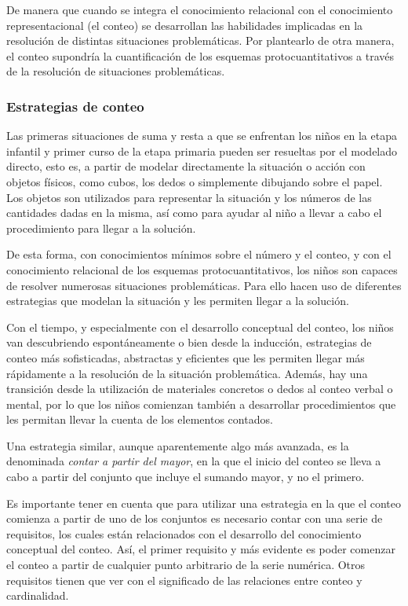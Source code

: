 \documentclass{article}
\begin{document}
De manera que cuando se integra el conocimiento relacional con el conocimiento representacional (el conteo) se desarrollan las habilidades implicadas en la resolución de distintas situaciones problemáticas. Por plantearlo de otra manera, el conteo supondría la cuantificación de los esquemas protocuantitativos a través de la resolución de situaciones problemáticas. 

\subsubsection{Estrategias de conteo}
Las primeras situaciones de suma y resta a que se enfrentan los niños en la etapa infantil y primer curso de la etapa primaria pueden ser resueltas por el modelado directo, esto es, a partir de modelar directamente la situación o acción con objetos físicos, como cubos, los dedos o simplemente dibujando sobre el papel. Los objetos son utilizados para representar la situación y los números de las cantidades dadas en la misma, así como para ayudar al niño a llevar a cabo el procedimiento para llegar a la solución.

De esta forma, con conocimientos mínimos sobre el número y el conteo, y con el conocimiento relacional de los esquemas protocuantitativos, los niños son capaces de resolver numerosas situaciones problemáticas. Para ello hacen uso de diferentes estrategias que modelan la situación y les permiten llegar a la solución.

Con el tiempo, y especialmente con el desarrollo conceptual del conteo, los niños van descubriendo espontáneamente o bien desde la inducción, estrategias de conteo más sofisticadas, abstractas y eficientes que les permiten llegar más rápidamente a la resolución de la situación problemática. Además, hay una transición desde la utilización de materiales concretos o dedos al conteo verbal o mental, por lo que los niños comienzan también a desarrollar procedimientos que les permitan llevar la cuenta de los elementos contados. 

Una estrategia similar, aunque aparentemente algo más avanzada, es la denominada \emph{contar a partir del mayor}, en la que el inicio del conteo se lleva a cabo a partir del conjunto que incluye el sumando mayor, y no el primero. 

Es importante tener en cuenta que para utilizar una estrategia en la que el conteo comienza a partir de uno de los conjuntos es necesario contar con una serie de requisitos, los cuales están relacionados con el desarrollo del conocimiento conceptual del conteo. Así, el primer requisito y más evidente es poder comenzar el conteo a partir de cualquier punto arbitrario de la serie numérica. Otros requisitos tienen que ver con el significado de las relaciones entre conteo y cardinalidad.
\end{document}
